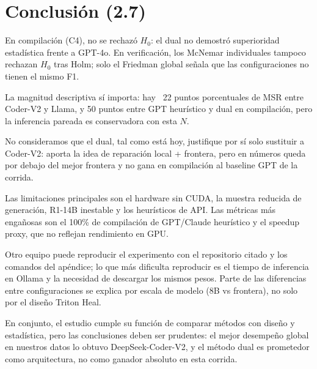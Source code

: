 \section{Conclusión (2.7)}

En compilación (C4), no se rechazó $H_0$: el dual no demostró superioridad estadística frente a GPT-4o. En verificación, los McNemar individuales tampoco rechazan $H_0$ tras Holm; solo el Friedman global señala que las configuraciones no tienen el mismo F1.

La magnitud descriptiva sí importa: hay ~22 puntos porcentuales de MSR entre Coder-V2 y Llama, y 50 puntos entre GPT heurístico y dual en compilación, pero la inferencia pareada es conservadora con esta $N$.

No consideramos que el dual, tal como está hoy, justifique por sí solo sustituir a Coder-V2: aporta la idea de reparación local + frontera, pero en números queda por debajo del mejor frontera y no gana en compilación al baseline GPT de la corrida.

Las limitaciones principales son el hardware sin CUDA, la muestra reducida de generación, R1-14B inestable y los heurísticos de API. Las métricas más engañosas son el 100\% de compilación de GPT/Claude heurístico y el speedup proxy, que no reflejan rendimiento en GPU.

Otro equipo puede reproducir el experimento con el repositorio citado y los comandos del apéndice; lo que más dificulta reproducir es el tiempo de inferencia en Ollama y la necesidad de descargar los mismos pesos. Parte de las diferencias entre configuraciones se explica por escala de modelo (8B vs frontera), no solo por el diseño Triton Heal.

En conjunto, el estudio cumple su función de comparar métodos con diseño y estadística, pero las conclusiones deben ser prudentes: el mejor desempeño global en nuestros datos lo obtuvo DeepSeek-Coder-V2, y el método dual es prometedor como arquitectura, no como ganador absoluto en esta corrida.
